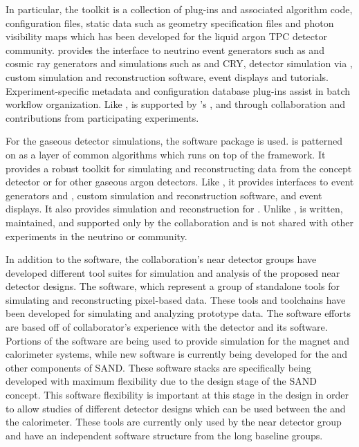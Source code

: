 \documentclass[../main-v1.tex]{subfiles}
\begin{document}
In particular, the  toolkit is a collection of  plug-ins and associated algorithm code, configuration files, static data such as geometry specification files and photon visibility maps which has been developed for the liquid argon TPC detector community.   provides the interface to neutrino event generators such as  and cosmic ray generators and simulations such as  and CRY,
detector simulation via , custom simulation and reconstruction software, event displays and tutorials.  Experiment-specific metadata and configuration database plug-ins assist in batch workflow organization.  Like ,  is supported by 's , and through collaboration and contributions from participating experiments.

For the gaseous detector simulations, the  software package is used.   is patterned on  as a layer of common algorithms which runs on top of the  framework.  It provides a robust toolkit for simulating and reconstructing data from the  concept detector or for other gaseous argon detectors.  Like , it provides interfaces to event generators and , custom simulation and reconstruction software, and event displays.  It also provides simulation and reconstruction for .  Unlike ,  is written, maintained, and supported only by the  collaboration and is not shared with other experiments in the neutrino or  community.

In addition to the  software, the  collaboration's near detector groups have developed different tool suites for simulation and analysis of the proposed near detector designs.  The  software, which represent a group of standalone tools for simulating and reconstructing pixel-based  data.  These tools and toolchains have been developed for simulating and analyzing  prototype data.  The  software efforts are based off of collaborator's experience with the  detector and its software.  Portions of the  software are being used to provide simulation for the magnet and calorimeter systems, while new software is currently being developed for the  and other components of SAND.  These software stacks are specifically being developed with maximum flexibility due to the design stage of the SAND concept.  This software flexibility is important at this stage in the design in order to allow studies of different detector designs which can be used between the  and the calorimeter.  These tools are currently only used by the near detector group and have an independent software structure from the long baseline groups.
\end{document}
